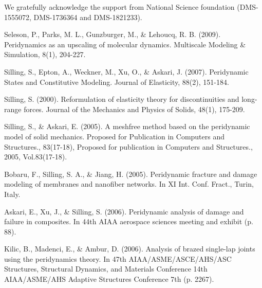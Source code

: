 \begin{acknowledgements}
We gratefully acknowledge the support from National Science foundation (DMS-1555072, DMS-1736364 and DMS-1821233).
\end{acknowledgements}




\begin{thebibliography}{}
%
%

Seleson, P., Parks, M. L., Gunzburger, M., \& Lehoucq, R. B. (2009). Peridynamics as an upscaling of molecular dynamics. Multiscale Modeling \& Simulation, 8(1), 204-227.

Silling, S., Epton, A., Weckner, M., Xu, O., \& Askari, J. (2007). Peridynamic States and Constitutive Modeling. Journal of Elasticity, 88(2), 151-184.

Silling, S. (2000). Reformulation of elasticity theory for discontinuities and long-range forces. Journal of the Mechanics and Physics of Solids, 48(1), 175-209.

Silling, S., \& Askari, E. (2005). A meshfree method based on the peridynamic model of solid mechanics. Proposed for Publication in Computers and Structures., 83(17-18), Proposed for publication in Computers and Structures., 2005, Vol.83(17-18).

Bobaru, F., Silling, S. A., \& Jiang, H. (2005). Peridynamic fracture and damage modeling of membranes and nanofiber networks. In XI Int. Conf. Fract., Turin, Italy.

Askari, E., Xu, J., \& Silling, S. (2006). Peridynamic analysis of damage and failure in composites. In 44th AIAA aerospace sciences meeting and exhibit (p. 88).

Kilic, B., Madenci, E., \& Ambur, D. (2006). Analysis of brazed single-lap joints using the peridynamics theory. In 47th AIAA/ASME/ASCE/AHS/ASC Structures, Structural Dynamics, and Materials Conference 14th AIAA/ASME/AHS Adaptive Structures Conference 7th (p. 2267).


\end{thebibliography}
